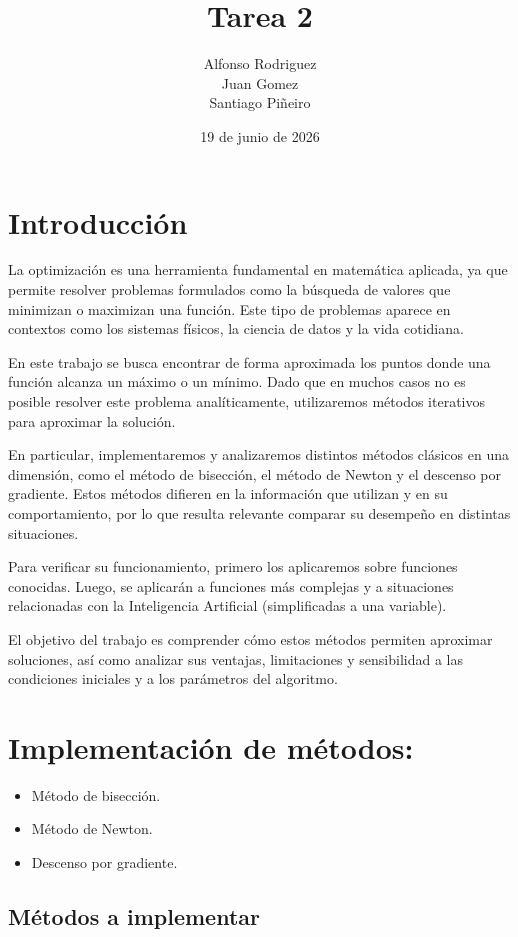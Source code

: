 \documentclass[12pt]{article}
\title{Tarea 2}
\author{
Alfonso Rodriguez \\
Juan Gomez \\
Santiago Piñeiro
}
\date{19 de junio de 2026}
\begin{document}
\maketitle

\section{Introducción}

La optimización es una herramienta fundamental en matemática aplicada, ya que permite resolver problemas formulados como la búsqueda de valores que minimizan o maximizan una función. Este tipo de problemas aparece en contextos como los sistemas físicos, la ciencia de datos y la vida cotidiana.

En este trabajo se busca encontrar de forma aproximada los puntos donde una función alcanza un máximo o un mínimo. Dado que en muchos casos no es posible resolver este problema analíticamente, utilizaremos métodos iterativos para aproximar la solución.

En particular, implementaremos y analizaremos distintos métodos clásicos en una dimensión, como el método de bisección, el método de Newton y el descenso por gradiente. Estos métodos difieren en la información que utilizan y en su comportamiento, por lo que resulta relevante comparar su desempeño en distintas situaciones.

Para verificar su funcionamiento, primero los aplicaremos sobre funciones conocidas. Luego, se aplicarán a funciones más complejas y a situaciones relacionadas con la Inteligencia Artificial (simplificadas a una variable).

El objetivo del trabajo es comprender cómo estos métodos permiten aproximar soluciones, así como analizar sus ventajas, limitaciones y sensibilidad a las condiciones iniciales y a los parámetros del algoritmo.


\section{Implementación de métodos:}
\begin{itemize}
\item Método de bisección.

\item Método de Newton.
\item Descenso por gradiente.
\end{itemize}

\subsection{Métodos a implementar}
\end{document}

